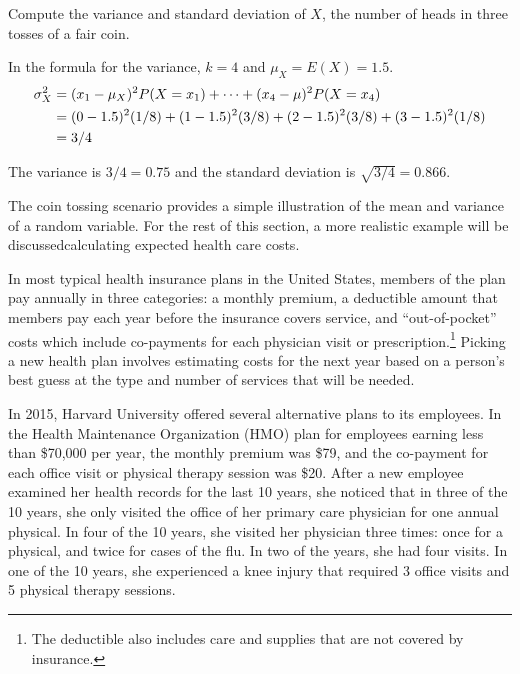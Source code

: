 \begin{example}{Compute the variance and standard deviation of $X$, the number of heads in three tosses of a fair coin.}
	
	In the formula for the variance, $k = 4$ and $\mu_X = E(X) = 1.5$. 
	\begin{align*}
	\sigma_X^2 &= (x_1-\mu_X)^2P(X=x_1) + \cdots \notag + (x_4-\mu)^2 P(X=x_4) \notag \\
	&= (0- 1.5)^2(1/8) + (1 - 1.5)^2 (3/8) + 
	(2 -1.5)^2 (3/8) + (3-1.5)^2 (1/8) \notag \\
	&= 3/4
	\end{align*}
	
	The variance is $3/4 = 0.75$ and the standard deviation is $\sqrt{3/4} = 0.866$.  
	
\end{example}

The coin tossing scenario provides a simple illustration of the mean and variance of a random variable. For the rest of this section, a more realistic example will be discussed\textemdash calculating expected health care costs.

\label{healthCareCostsEmployee}
In most typical health insurance plans in the United States, members of the plan pay annually in three categories: a monthly premium, a deductible amount that members pay each year before the insurance covers service, and ``out-of-pocket'' costs which include co-payments for each physician visit or prescription.\footnote{The deductible also includes care and supplies that are not covered by insurance.} Picking a new health plan involves estimating costs for the next year based on a person's best guess at the type and number of services that will be needed.

In 2015, Harvard University offered several alternative plans to its employees. In the Health Maintenance Organization (HMO) plan for employees earning less than \$70,000 per year, the monthly premium was \$79, and the co-payment for each office visit or physical therapy session was \$20. After a new employee examined her health records for the last 10 years, she noticed that in three of the 10 years, she only visited the office of her primary care physician  for one annual physical. In four of the 10 years, she visited her physician three times: once for a physical, and twice for cases of the flu. In two of the years, she had four visits. In one of the 10 years, she experienced a knee injury that required 3 office visits and 5 physical therapy sessions.

